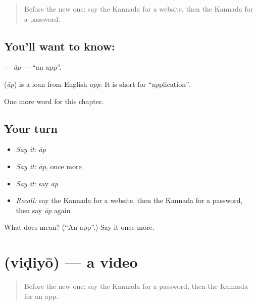 \label{lesson:KA-C264-ap}



\begin{quote}
Before the new one: say the Kannada for a website, then the Kannada for a password.
\end{quote}

\subsection*{You'll want to know: }
\textbf{} — \emph{āp} — \textquotedblleft{}an app\textquotedblright{}.

\begin{cousinweb}
\textbf{} (\emph{āp}) is a loan from English \emph{app}. It is short for \textquotedblleft{}application\textquotedblright{}.
\end{cousinweb}

\begin{grammarlens}[title={What you've built}]
One more word for this chapter.
\end{grammarlens}

\subsection*{Your turn}
\begin{itemize}
\raggedright
  \item \emph{Say it:} \emph{āp}
  \item \emph{Say it:} \emph{āp}, once more
  \item \emph{Say it:} say \emph{āp}
  \item \emph{Recall:} say the Kannada for a website, then the Kannada for a password, then say \emph{āp} again
\end{itemize}

\begin{tcolorbox}[breakable,colback=teal!4,colframe=teal!35!black,title={Before you move on}]
What does  mean? (\textquotedblleft{}An app\textquotedblright{}.) Say it once more.
\end{tcolorbox}
\section[\texorpdfstring{\kn{ವಿಡಿಯೋ} (viḍiyō)}{ವಿಡಿಯೋ (viḍiyō)}]{ (viḍiyō) — a video}

\label{lesson:KA-C264-vidiyo}



\begin{quote}
Before the new one: say the Kannada for a password, then the Kannada for an app.
\end{quote}

